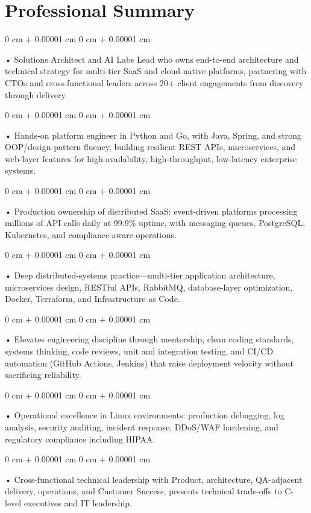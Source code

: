 \documentclass[10pt, letterpaper]{article}
\newenvironment{onecolentry}{
    \begin{adjustwidth}{
        0 cm + 0.00001 cm
    }{
        0 cm + 0.00001 cm
    }
}{
    \end{adjustwidth}
} %
\begin{document}
    \section{Professional Summary}
        \vspace{2 pt }
        \begin{onecolentry}
            • Solutions Architect and AI Labs Lead who owns end-to-end architecture and technical strategy for multi-tier SaaS and cloud-native platforms, partnering with CTOs and cross-functional leaders across 20+ client engagements from discovery through delivery.
        \end{onecolentry}
        \begin{onecolentry}
            • Hands-on platform engineer in Python and Go, with Java, Spring, and strong OOP/design-pattern fluency, building resilient REST APIs, microservices, and web-layer features for high-availability, high-throughput, low-latency enterprise systems.
        \end{onecolentry}
        \begin{onecolentry}
            • Production ownership of distributed SaaS: event-driven platforms processing millions of API calls daily at 99.9\% uptime, with messaging queues, PostgreSQL, Kubernetes, and compliance-aware operations.
        \end{onecolentry}
        \begin{onecolentry}
            • Deep distributed-systems practice---multi-tier application architecture, microservices design, RESTful APIs, RabbitMQ, database-layer optimization, Docker, Terraform, and Infrastructure as Code.
        \end{onecolentry}
        \begin{onecolentry}
            • Elevates engineering discipline through mentorship, clean coding standards, systems thinking, code reviews, unit and integration testing, and CI/CD automation (GitHub Actions, Jenkins) that raise deployment velocity without sacrificing reliability.
        \end{onecolentry}
        \begin{onecolentry}
            • Operational excellence in Linux environments: production debugging, log analysis, security auditing, incident response, DDoS/WAF hardening, and regulatory compliance including HIPAA.
        \end{onecolentry}
        \begin{onecolentry}
            • Cross-functional technical leadership with Product, architecture, QA-adjacent delivery, operations, and Customer Success; presents technical trade-offs to C-level executives and IT leadership.
        \end{onecolentry}
\end{document}
